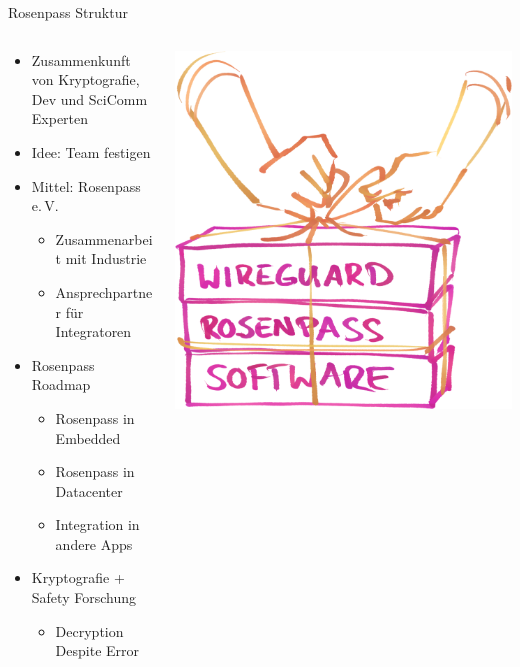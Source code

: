 \documentclass{rosenpass-beamer}
\begin{document}
\begin{frame}{Rosenpass Struktur}
\begin{columns}[c]
\begin{column}{0.7\textwidth}
\begin{itemize}
\item  Zusammenkunft von Kryptografie, Dev und SciComm Experten
\item  Idee: Team festigen
\item  Mittel: Rosenpass e.\,V.

  \begin{itemize}
    \item Zusammenarbeit mit Industrie
  \item Ansprechpartner für Integratoren
  \end{itemize}
\item  Rosenpass Roadmap

  \begin{itemize}
    \item Rosenpass in Embedded
  \item Rosenpass in Datacenter
  \item Integration in andere Apps
  \end{itemize}
\item  Kryptografie + Safety Forschung

  \begin{itemize}
    \item Decryption Despite Error
  \end{itemize}
\end{itemize}
\end{column}

\begin{column}{0.2\textwidth}
\includegraphics[width=\linewidth]{graphics/rosenpass in anderen apps.png}


\end{column}
\end{columns}
\end{frame}
\end{document}
